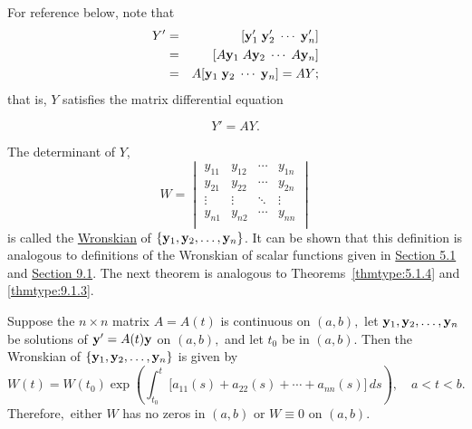\documentclass{ximera}
\begin{document}
For reference below, note that
\begin{eqnarray*}
Y'&=&[{\bf y}_1'\; {\bf y}_2'\; \cdots\; {\bf y}_n']\\
&=&[A{\bf y}_1\; A{\bf y}_2\; \cdots\; A{\bf y}_n]\\
&=&A[{\bf y}_1\; {\bf y}_2\; \cdots\; {\bf y}_n]=AY;
\end{eqnarray*}
that is, $Y$ satisfies the matrix differential equation

$$
Y'=AY.
$$

The determinant of $Y$,
\begin{equation} \label{eq:10.3.5}
W=\begin{vmatrix}
y_{11}&y_{12}&\cdots&y_{1n} \\
y_{21}&y_{22}&\cdots&y_{2n}\\
\vdots&\vdots&\ddots&\vdots \\
y_{n1}&y_{n2}&\cdots&y_{nn} \\
\end{vmatrix}
\end{equation}
is called the
\href{https://en.wikipedia.org/wiki/Wronskian}{Wronskian} of $\{{\bf y}_1,{\bf y}_2,\dots,{\bf
y}_n\}$. It can be shown 
that this definition is analogous to definitions of the Wronskian of scalar functions given in \href{https://xerxes.ximera.org/differentialequations/main/homogeneousLinearEquations/homogeneousLinearEquations}{Section 5.1} and \href{https://xerxes.ximera.org/differentialequations/main/linearHigherOrder/linearHigherOrder}{Section 9.1}.
The next theorem is analogous to
Theorems~\ref{thmtype:5.1.4} and
\ref{thmtype:9.1.3}. %

\begin{theorem} \label{thmtype:10.3.2}
Suppose the $n\times n$ matrix $A=A(t)$ is continuous on $(a,b),$ let
${\bf y}_1, {\bf y}_2, \dots, {\bf y}_n$ be solutions of ${\bf
y}'=A(t){\bf y}$ on $(a,b),$ and let $t_0$ be in $(a,b)$. Then the
Wronskian of $\{{\bf y}_1,{\bf y}_2,\dots,{\bf y}_n\}$ is given by
\begin{equation} \label{eq:10.3.6}
W(t)=W(t_0)\exp\left(
\int^t_{t_0}\big[a_{11}(s)+a_{22}(s)+\cdots+a_{nn}(s)]\,
ds\right), \quad  a < t < b.
\end{equation}
Therefore$,$  either $W$ has no zeros in  $(a,b)$ or $W\equiv0$
on  $(a,b).$
\end{theorem}
\end{document}
